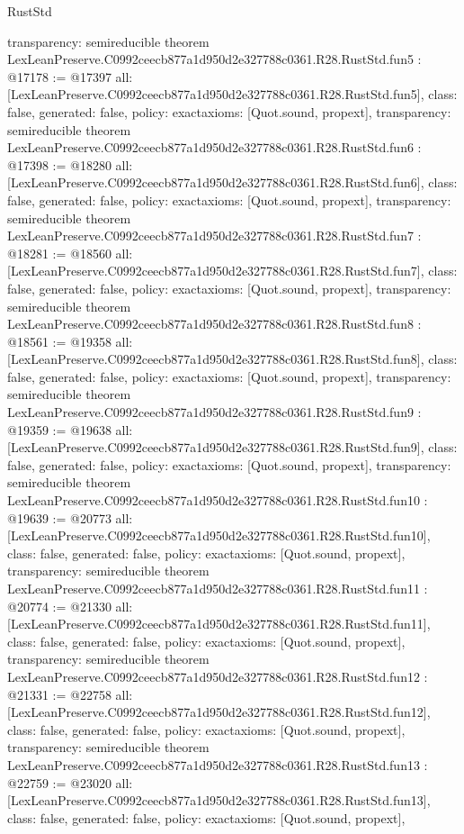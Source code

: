 \begin{lexlean}{RustStd}
\begin{coremodule}
{  transparency: semireducible
}
theorem LexLeanPreserve.C0992ceecb877a1d950d2e327788c0361.R28.RustStd.fun5 : @17178 := @17397 {
  all: [LexLeanPreserve.C0992ceecb877a1d950d2e327788c0361.R28.RustStd.fun5],
  class: false,
  generated: false,
  policy: exact{axioms: [Quot.sound, propext]},
  transparency: semireducible
}
theorem LexLeanPreserve.C0992ceecb877a1d950d2e327788c0361.R28.RustStd.fun6 : @17398 := @18280 {
  all: [LexLeanPreserve.C0992ceecb877a1d950d2e327788c0361.R28.RustStd.fun6],
  class: false,
  generated: false,
  policy: exact{axioms: [Quot.sound, propext]},
  transparency: semireducible
}
theorem LexLeanPreserve.C0992ceecb877a1d950d2e327788c0361.R28.RustStd.fun7 : @18281 := @18560 {
  all: [LexLeanPreserve.C0992ceecb877a1d950d2e327788c0361.R28.RustStd.fun7],
  class: false,
  generated: false,
  policy: exact{axioms: [Quot.sound, propext]},
  transparency: semireducible
}
theorem LexLeanPreserve.C0992ceecb877a1d950d2e327788c0361.R28.RustStd.fun8 : @18561 := @19358 {
  all: [LexLeanPreserve.C0992ceecb877a1d950d2e327788c0361.R28.RustStd.fun8],
  class: false,
  generated: false,
  policy: exact{axioms: [Quot.sound, propext]},
  transparency: semireducible
}
theorem LexLeanPreserve.C0992ceecb877a1d950d2e327788c0361.R28.RustStd.fun9 : @19359 := @19638 {
  all: [LexLeanPreserve.C0992ceecb877a1d950d2e327788c0361.R28.RustStd.fun9],
  class: false,
  generated: false,
  policy: exact{axioms: [Quot.sound, propext]},
  transparency: semireducible
}
theorem LexLeanPreserve.C0992ceecb877a1d950d2e327788c0361.R28.RustStd.fun10 : @19639 := @20773 {
  all: [LexLeanPreserve.C0992ceecb877a1d950d2e327788c0361.R28.RustStd.fun10],
  class: false,
  generated: false,
  policy: exact{axioms: [Quot.sound, propext]},
  transparency: semireducible
}
theorem LexLeanPreserve.C0992ceecb877a1d950d2e327788c0361.R28.RustStd.fun11 : @20774 := @21330 {
  all: [LexLeanPreserve.C0992ceecb877a1d950d2e327788c0361.R28.RustStd.fun11],
  class: false,
  generated: false,
  policy: exact{axioms: [Quot.sound, propext]},
  transparency: semireducible
}
theorem LexLeanPreserve.C0992ceecb877a1d950d2e327788c0361.R28.RustStd.fun12 : @21331 := @22758 {
  all: [LexLeanPreserve.C0992ceecb877a1d950d2e327788c0361.R28.RustStd.fun12],
  class: false,
  generated: false,
  policy: exact{axioms: [Quot.sound, propext]},
  transparency: semireducible
}
theorem LexLeanPreserve.C0992ceecb877a1d950d2e327788c0361.R28.RustStd.fun13 : @22759 := @23020 {
  all: [LexLeanPreserve.C0992ceecb877a1d950d2e327788c0361.R28.RustStd.fun13],
  class: false,
  generated: false,
  policy: exact{axioms: [Quot.sound, propext]},
}
\end{coremodule}
\end{lexlean}
